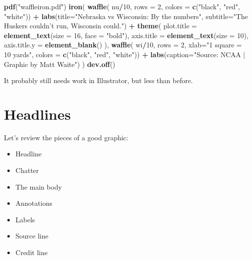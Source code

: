 \documentclass[
]{book}
\newenvironment{Shaded}{\begin{snugshade}}{\end{snugshade}}
\newcommand{\DataTypeTok}[1]{\textcolor[rgb]{0.13,0.29,0.53}{#1}}
\newcommand{\DecValTok}[1]{\textcolor[rgb]{0.00,0.00,0.81}{#1}}
\newcommand{\KeywordTok}[1]{\textcolor[rgb]{0.13,0.29,0.53}{\textbf{#1}}}
\newcommand{\NormalTok}[1]{#1}
\newcommand{\OperatorTok}[1]{\textcolor[rgb]{0.81,0.36,0.00}{\textbf{#1}}}
\newcommand{\StringTok}[1]{\textcolor[rgb]{0.31,0.60,0.02}{#1}}
\providecommand{\tightlist}{%
  \setlength{\itemsep}{0pt}\setlength{\parskip}{0pt}}
\begin{document}
\begin{Shaded}
\begin{Highlighting}[]
\KeywordTok{pdf}\NormalTok{(}\StringTok{"waffleiron.pdf"}\NormalTok{)}
\KeywordTok{iron}\NormalTok{(}
 \KeywordTok{waffle}\NormalTok{(}
\NormalTok{   nu}\OperatorTok{/}\DecValTok{10}\NormalTok{, }
   \DataTypeTok{rows =} \DecValTok{2}\NormalTok{, }
   \DataTypeTok{colors =} \KeywordTok{c}\NormalTok{(}\StringTok{"black"}\NormalTok{, }\StringTok{"red"}\NormalTok{, }\StringTok{"white"}\NormalTok{)) }\OperatorTok{+}\StringTok{ }
\StringTok{   }\KeywordTok{labs}\NormalTok{(}\DataTypeTok{title=}\StringTok{"Nebraska vs Wisconsin: By the numbers"}\NormalTok{, }\DataTypeTok{subtitle=}\StringTok{"The Huskers couldn't run, Wisconsin could."}\NormalTok{) }\OperatorTok{+}\StringTok{ }
\StringTok{   }\KeywordTok{theme}\NormalTok{(}
    \DataTypeTok{plot.title =} \KeywordTok{element_text}\NormalTok{(}\DataTypeTok{size =} \DecValTok{16}\NormalTok{, }\DataTypeTok{face =} \StringTok{"bold"}\NormalTok{),}
    \DataTypeTok{axis.title =} \KeywordTok{element_text}\NormalTok{(}\DataTypeTok{size =} \DecValTok{10}\NormalTok{),}
    \DataTypeTok{axis.title.y =} \KeywordTok{element_blank}\NormalTok{()}
\NormalTok{  ),}
 \KeywordTok{waffle}\NormalTok{(}
\NormalTok{   wi}\OperatorTok{/}\DecValTok{10}\NormalTok{, }
   \DataTypeTok{rows =} \DecValTok{2}\NormalTok{, }
   \DataTypeTok{xlab=}\StringTok{"1 square = 10 yards"}\NormalTok{, }
   \DataTypeTok{colors =} \KeywordTok{c}\NormalTok{(}\StringTok{"black"}\NormalTok{, }\StringTok{"red"}\NormalTok{, }\StringTok{"white"}\NormalTok{)) }\OperatorTok{+}\StringTok{ }\KeywordTok{labs}\NormalTok{(}\DataTypeTok{caption=}\StringTok{"Source: NCAA | Graphic by Matt Waite"}\NormalTok{)}
\NormalTok{) }
\KeywordTok{dev.off}\NormalTok{()}
\end{Highlighting}
\end{Shaded}

It probably still needs work in Illustrator, but less than before.

\hypertarget{headlines}{%
\chapter{Headlines}\label{headlines}}

Let's review the pieces of a good graphic:

\begin{itemize}
\tightlist
\item
  Headline
\item
  Chatter
\item
  The main body
\item
  Annotations
\item
  Labels
\item
  Source line
\item
  Credit line
\end{itemize}
\end{document}
